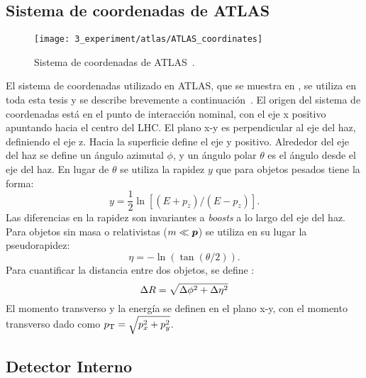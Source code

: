 \subsection{Sistema de coordenadas de ATLAS}

\begin{figure}[ht!]
    \centering
    \texttt{[image: 3\_experiment/atlas/ATLAS\_coordinates]}
    \caption{Sistema de coordenadas de \ac{ATLAS}~\cite{ATLAS-Diagram}.}
    \label{fig:atlas:atlas:atlas_coordinates}
\end{figure}

El sistema de coordenadas utilizado en \ac{ATLAS}, que se muestra en \Fig{\ref{fig:atlas:atlas:atlas_coordinates}}, se utiliza en toda esta tesis y se describe brevemente a continuación~\cite{ATLAS}.
El origen del sistema de coordenadas está en el punto de interacción nominal, con el eje x positivo apuntando hacia el centro del \ac{LHC}. El plano x-y es perpendicular al eje del haz, definiendo el eje z. Hacia la superficie define el eje y positivo. Alrededor del eje del haz se define un ángulo azimutal $\phi$, y un ángulo polar $\theta$ es el ángulo desde el eje del haz. En lugar de $\theta$ se utiliza la rapidez $y$ que para objetos pesados tiene la forma:
\begin{equation}
    y = \frac{1}{2} \ln[(E+p_z)/(E-p_z)].
\end{equation}
Las diferencias en la rapidez son invariantes a \textit{boosts} a lo largo del eje del haz. Para objetos sin masa o relativistas ($m \ll \vb*{p}$) se utiliza en su lugar la pseudorapidez:
\begin{equation}
    \eta = -\ln(\tan(\theta/2)).
\end{equation}
Para cuantificar la distancia entre dos objetos, se define \DeltaR:
\begin{equation}
    \Delta R = \sqrt{\Delta\phi^2 + \Delta\eta^2}
\end{equation}
El momento transverso y la energía se definen en el plano x-y, con el momento transverso dado como $p_{\text{T}} = \sqrt{p_x^2 +p_y^2}$.






\subsection{Detector Interno}
\label{subsec:atlas:atlas:id}

